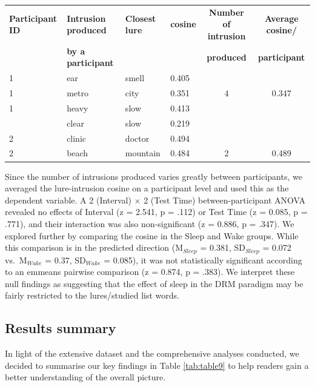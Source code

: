 \documentclass[
]{article}
\begin{document}
\begin{table}[H]
\centering\begingroup\fontsize{8}{10}\selectfont

\begin{tabular}{llllcc}
\toprule
\textbf{Participant ID} & \textbf{Intrusion produced} & \textbf{Closest lure} & \textbf{cosine} & \textbf{Number of intrusion} & \textbf{Average cosine/}\\
\textbf{} & \textbf{by a participant} & \textbf{} & \textbf{} & \textbf{produced} & \textbf{participant}\\
\midrule
1 & ear & smell & 0.405 &  & \\
1 & metro & city & 0.351 & 4 & 0.347\\
1 & heavy & slow & 0.413 &  & \\
\addlinespace
1 & clear & slow & 0.219 &  & \\
\midrule
2 & clinic & doctor & 0.494 &  & \\
2 & beach & mountain & 0.484 & 2 & 0.489\\
\bottomrule
\end{tabular}
\endgroup{}
\end{table}

Since the number of intrusions produced varies greatly between participants, we averaged the lure-intrusion cosine on a participant level and used this as the dependent variable. A 2 (Interval) \(\times\) 2 (Test Time) between-participant ANOVA revealed no effects of Interval (z = 2.541, p = .112) or Test Time (z = 0.085, p = .771), and their interaction was also non-significant (z = 0.886, p = .347). We explored further by comparing the cosine in the Sleep and Wake groups. While this comparison is in the predicted direction (M\(_{Sleep}\) = 0.381, SD\(_{Sleep}\) = 0.072 vs.~M\(_{Wake}\) = 0.37, SD\(_{Wake}\) = 0.085), it was not statistically significant according to an emmeans pairwise comparison (z = 0.874, p = .383). We interpret these null findings as suggesting that the effect of sleep in the DRM paradigm may be fairly restricted to the lures/studied list words.

\hypertarget{results-summary}{%
\subsection{Results summary}\label{results-summary}}

In light of the extensive dataset and the comprehensive analyses conducted, we decided to summarise our key findings in Table \ref{tab:table9} to help readers gain a better understanding of the overall picture.
\end{document}
